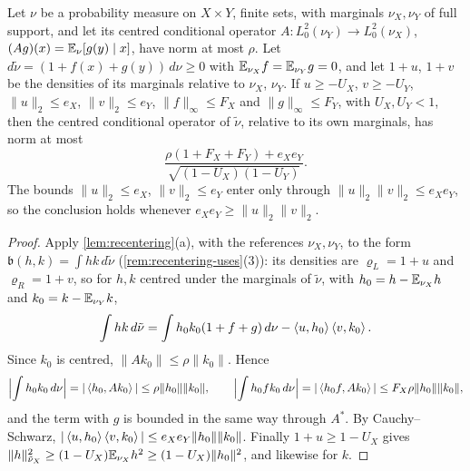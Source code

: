 \begin{lemma}\label{lem:record:additive-cancellation}
Let $\nu$ be a probability measure on $X\times Y$, finite sets, with marginals
$\nu_X,\nu_Y$ of full support, and let its centred conditional operator
$A\colon L^2_0(\nu_Y)\to L^2_0(\nu_X)$, $(Ag)(x)=\mathbb E_\nu[g(y)\mid x]$, have norm at
most $\rho$. Let $d\tilde\nu=(1+f(x)+g(y))\,d\nu\ge0$ with
$\mathbb E_{\nu_X}f=\mathbb E_{\nu_Y}g=0$, and let $1+u$, $1+v$ be the densities of its
marginals relative to $\nu_X$, $\nu_Y$. If $u\ge-U_X$, $v\ge-U_Y$,
$\|u\|_2\le e_X$, $\|v\|_2\le e_Y$, $\|f\|_\infty\le F_X$ and $\|g\|_\infty\le F_Y$,
with $U_X,U_Y<1$, then the centred conditional operator of $\tilde\nu$, relative
to its own marginals, has norm at most
\[
 \frac{\rho(1+F_X+F_Y)+e_Xe_Y}{\sqrt{(1-U_X)(1-U_Y)}} .
\]
The bounds $\|u\|_2\le e_X$, $\|v\|_2\le e_Y$ enter only through
$\|u\|_2\|v\|_2\le e_Xe_Y$, so the conclusion holds whenever $e_Xe_Y\ge\|u\|_2\|v\|_2$.
\end{lemma}

\begin{proof}
Apply \cref{lem:recentering}(a), with the references $\nu_X,\nu_Y$, to the form
$\mathfrak b(h,k)=\int hk\,d\tilde\nu$ (\cref{rem:recentering-uses}(3)): its
densities are $\varrho_L=1+u$ and $\varrho_R=1+v$, so for $h,k$ centred under the
marginals of $\tilde\nu$, with $h_0=h-\mathbb E_{\nu_X}h$ and $k_0=k-\mathbb E_{\nu_Y}k$,
\[
 \int hk\,d\tilde\nu=\int h_0k_0(1+f+g)\,d\nu-\left\langle u,h_0\right\rangle\left\langle v,k_0\right\rangle .
\]
Since $k_0$ is centred, $\|Ak_0\|\le\rho\|k_0\|$. Hence
\[
 \Bigl|\int h_0k_0\,d\nu\Bigr|=|\left\langle h_0,Ak_0\right\rangle|\le\rho\|h_0\|\|k_0\|,\qquad
 \Bigl|\int h_0fk_0\,d\nu\Bigr|=|\left\langle h_0f,Ak_0\right\rangle|\le F_X\rho\|h_0\|\|k_0\|,
\]
and the term with $g$ is bounded in the same way through $A^*$. By
Cauchy--Schwarz, $|\left\langle u,h_0\right\rangle\left\langle v,k_0\right\rangle|\le e_Xe_Y\|h_0\|\|k_0\|$. Finally
$1+u\ge1-U_X$ gives
$\|h\|^2_{\tilde\nu_X}\ge(1-U_X)\mathbb E_{\nu_X}h^2\ge(1-U_X)\|h_0\|^2$, and likewise for
$k$.
\end{proof}

